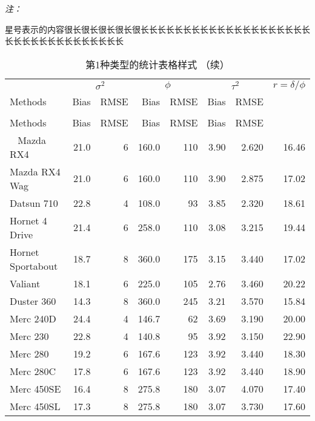 \documentclass[]{book}
\begin{document}
\begin{ThreePartTable}
\begin{TableNotes}
\item \textit{注：} 
\item * 星号表示的内容很长很长很长很长很长长长长长长长长长长长长长长长长长长长长长长长长长长长长长长长长长长
\end{TableNotes}
\begin{longtable}[t]{lrrrrrrr}
\caption{\label{tab:kable}第1种类型的统计表格样式}\\
\toprule
\multicolumn{1}{c}{ } & \multicolumn{2}{c}{$\sigma^2$} & \multicolumn{2}{c}{$\phi$} & \multicolumn{2}{c}{$\tau^2$} & \multicolumn{1}{c}{$r=\delta/\phi$} \\
\cmidrule(l{2pt}r{2pt}){2-3} \cmidrule(l{2pt}r{2pt}){4-5} \cmidrule(l{2pt}r{2pt}){6-7} \cmidrule(l{2pt}r{2pt}){8-8}
Methods & Bias & RMSE & Bias & RMSE & Bias & RMSE & \\
\midrule
\endfirsthead
\caption[]{\label{tab:kable}第1种类型的统计表格样式 （续）}\\
\toprule
Methods & Bias & RMSE & Bias & RMSE & Bias & RMSE & \\
\midrule
\endhead
\
\endfoot
\bottomrule
\insertTableNotes
\endlastfoot
Mazda RX4 & 21.0 & 6 & 160.0 & 110 & 3.90 & 2.620 & 16.46\\
Mazda RX4 Wag & 21.0 & 6 & 160.0 & 110 & 3.90 & 2.875 & 17.02\\
Datsun 710 & 22.8 & 4 & 108.0 & 93 & 3.85 & 2.320 & 18.61\\
Hornet 4 Drive & 21.4 & 6 & 258.0 & 110 & 3.08 & 3.215 & 19.44\\
Hornet Sportabout & 18.7 & 8 & 360.0 & 175 & 3.15 & 3.440 & 17.02\\
Valiant & 18.1 & 6 & 225.0 & 105 & 2.76 & 3.460 & 20.22\\
\midrule
Duster 360 & 14.3 & 8 & 360.0 & 245 & 3.21 & 3.570 & 15.84\\
Merc 240D & 24.4 & 4 & 146.7 & 62 & 3.69 & 3.190 & 20.00\\
Merc 230 & 22.8 & 4 & 140.8 & 95 & 3.92 & 3.150 & 22.90\\
Merc 280 & 19.2 & 6 & 167.6 & 123 & 3.92 & 3.440 & 18.30\\
Merc 280C & 17.8 & 6 & 167.6 & 123 & 3.92 & 3.440 & 18.90\\
Merc 450SE & 16.4 & 8 & 275.8 & 180 & 3.07 & 4.070 & 17.40\\
\midrule
Merc 450SL & 17.3 & 8 & 275.8 & 180 & 3.07 & 3.730 & 17.60\\

\end{longtable}
\end{ThreePartTable}
\end{document}
